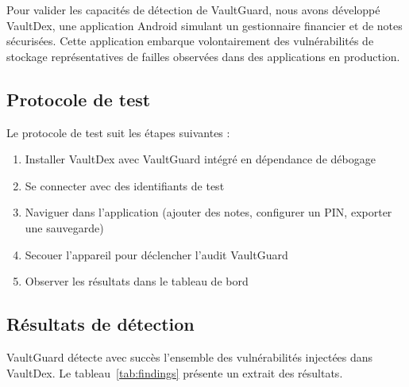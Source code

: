 \documentclass[preprint,12pt, a4paper]{elsarticle}
\begin{document}
Pour valider les capacités de détection de VaultGuard, nous avons développé VaultDex, une application Android simulant un gestionnaire financier et de notes sécurisées. Cette application embarque volontairement des vulnérabilités de stockage représentatives de failles observées dans des applications en production.

\subsection{Protocole de test}

Le protocole de test suit les étapes suivantes :

\begin{enumerate}
    \item Installer VaultDex avec VaultGuard intégré en dépendance de débogage
    \item Se connecter avec des identifiants de test
    \item Naviguer dans l'application (ajouter des notes, configurer un PIN, exporter une sauvegarde)
    \item Secouer l'appareil pour déclencher l'audit VaultGuard
    \item Observer les résultats dans le tableau de bord
\end{enumerate}

\subsection{Résultats de détection}

VaultGuard détecte avec succès l'ensemble des vulnérabilités injectées dans VaultDex. Le tableau~\ref{tab:findings} présente un extrait des résultats.
\end{document}

